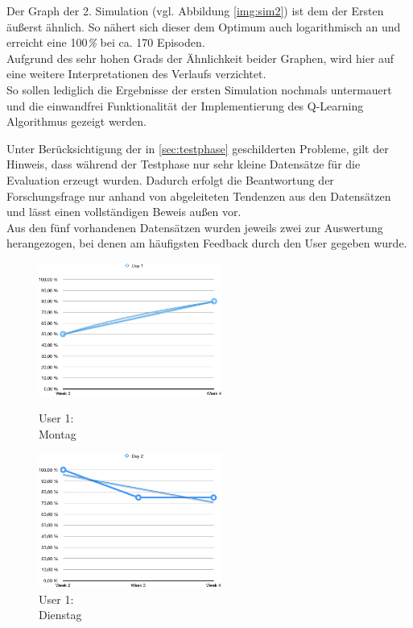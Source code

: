 Der Graph der 2. Simulation (vgl. Abbildung \ref{img:sim2}) ist dem der Ersten äußerst ähnlich. So nähert sich dieser dem Optimum auch logarithmisch an und erreicht eine 100\textit{\%}  bei ca. 170 Episoden.\\
Aufgrund des sehr hohen Grads der Ähnlichkeit beider Graphen, wird hier auf eine weitere Interpretationen des Verlaufs verzichtet. \\
So sollen lediglich die Ergebnisse der ersten Simulation nochmals untermauert und die einwandfrei Funktionalität der Implementierung des Q-Learning Algorithmus gezeigt werden. 

Unter Berücksichtigung der in \ref{sec:testphase} geschilderten Probleme, gilt der Hinweis, dass während der Testphase nur sehr kleine Datensätze für die Evaluation erzeugt wurden. Dadurch erfolgt die Beantwortung der Forschungsfrage nur anhand von abgeleiteten Tendenzen aus den Datensätzen und lässt einen vollständigen Beweis außen vor.  \\
Aus den fünf vorhandenen Datensätzen wurden jeweils zwei zur Auswertung herangezogen, bei denen am häufigsten Feedback durch den User gegeben wurde.\\

\begin{figure}[t!]
    \centering
    \parbox{6cm}{
    \includegraphics[width=6cm]{./Abbildungen/Kapitel_04/usr1day1.png}
    \caption{User 1: \\Montag}
    \label{img:usr1day1}}
    \qquad
    \begin{minipage}{6cm}
    \includegraphics[width=6cm]{./Abbildungen/Kapitel_04/usr1day2.png}
    \caption{User 1: \\Dienstag}
    \label{img:usr1day2}
    \end{minipage}
\end{figure}


